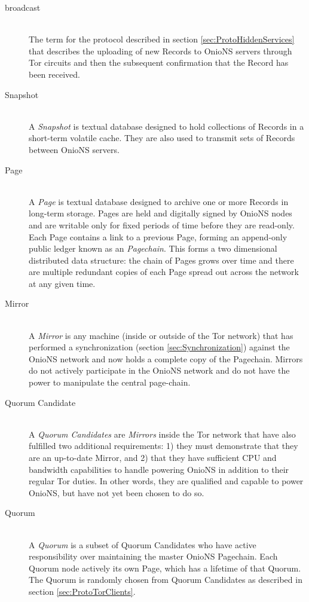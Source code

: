 \begin{description}
	\item[broadcast] \hfill \\
		The term for the protocol described in section \ref{sec:ProtoHiddenServices} that describes the uploading of new Records to OnioNS servers through Tor circuits and then the subsequent confirmation that the Record has been received.
		
	\item[Snapshot] \hfill \\
		A \emph{Snapshot} is textual database designed to hold collections of Records in a short-term volatile cache. They are also used to transmit sets of Records between OnioNS servers.

	\item[Page] \hfill \\
		A \emph{Page} is textual database designed to archive one or more Records in long-term storage. Pages are held and digitally signed by OnioNS nodes and are writable only for fixed periods of time before they are read-only. Each Page contains a link to a previous Page, forming an append-only public ledger known as an \emph{Pagechain}. This forms a two dimensional distributed data structure: the chain of Pages grows over time and there are multiple redundant copies of each Page spread out across the network at any given time. 
		
	\item[Mirror] \hfill \\
		A \emph{Mirror} is any machine (inside or outside of the Tor network) that has performed a synchronization (section \ref{sec:Synchronization}) against the OnioNS network and now holds a complete copy of the Pagechain. Mirrors do not actively participate in the OnioNS network and do not have the power to manipulate the central page-chain.

	\item[Quorum Candidate] \hfill \\
		A \emph{Quorum Candidates} are \emph{Mirrors} inside the Tor network that have also fulfilled two additional requirements: 1) they must demonstrate that they are an up-to-date Mirror, and 2) that they have sufficient CPU and bandwidth capabilities to handle powering OnioNS in addition to their regular Tor duties. In other words, they are qualified and capable to power OnioNS, but have not yet been chosen to do so.
		
	\item[Quorum] \hfill \\
		A \emph{Quorum} is a subset of Quorum Candidates who have active responsibility over maintaining the master OnioNS Pagechain. Each Quorum node actively its own Page, which has a lifetime of that Quorum. The Quorum is randomly chosen from Quorum Candidates as described in section \ref{sec:ProtoTorClients}.
					

\end{description}

